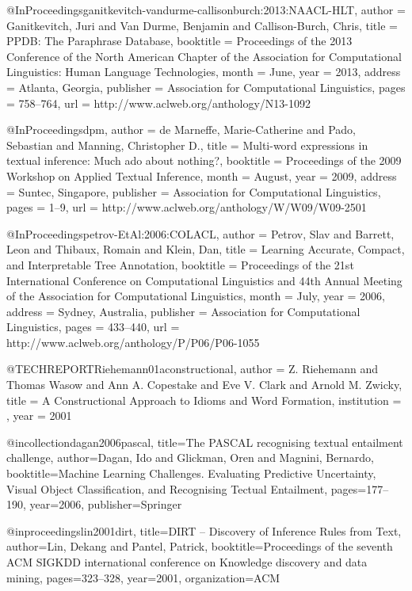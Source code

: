 @InProceedings{ganitkevitch-vandurme-callisonburch:2013:NAACL-HLT,
  author    = {Ganitkevitch, Juri  and  Van Durme, Benjamin  and  Callison-Burch, Chris},
  title     = {PPDB: The Paraphrase Database},
  booktitle = {Proceedings of the 2013 Conference of the North American Chapter of the Association for Computational Linguistics: Human Language Technologies},
  month     = {June},
  year      = {2013},
  address   = {Atlanta, Georgia},
  publisher = {Association for Computational Linguistics},
  pages     = {758--764},
  url       = {http://www.aclweb.org/anthology/N13-1092}
}

@InProceedings{dpm,
  author    = {de Marneffe, Marie-Catherine  and  Pado, Sebastian  and  Manning, Christopher D.},
  title     = {Multi-word expressions in textual inference: Much ado about nothing?},
  booktitle = {Proceedings of the 2009 Workshop on Applied Textual Inference},
  month     = {August},
  year      = {2009},
  address   = {Suntec, Singapore},
  publisher = {Association for Computational Linguistics},
  pages     = {1--9},
  url       = {http://www.aclweb.org/anthology/W/W09/W09-2501}
}

@InProceedings{petrov-EtAl:2006:COLACL,
   author    = {Petrov, Slav  and  Barrett, Leon  and  Thibaux, Romain  and  Klein, Dan},
   title     = {Learning Accurate, Compact, and Interpretable Tree Annotation},
   booktitle = {Proceedings of the 21st International Conference on Computational Linguistics and 44th Annual Meeting of the Association for Computational Linguistics},
   month     = {July},
   year      = {2006},
   address   = {Sydney, Australia},
   publisher = {Association for Computational Linguistics},
   pages     = {433--440},
   url       = {http://www.aclweb.org/anthology/P/P06/P06-1055}
}

@TECHREPORT{Riehemann01aconstructional,
    author = {Z. Riehemann and Thomas Wasow and Ann A. Copestake and Eve V. Clark and Arnold M. Zwicky},
    title = {A Constructional Approach to Idioms and Word Formation},
    institution = {},
    year = {2001}
}


@incollection{dagan2006pascal,
  title={The PASCAL recognising textual entailment challenge},
  author={Dagan, Ido and Glickman, Oren and Magnini, Bernardo},
  booktitle={Machine Learning Challenges. Evaluating Predictive Uncertainty, Visual Object Classification, and Recognising Tectual Entailment},
  pages={177--190},
  year={2006},
  publisher={Springer}
}


@inproceedings{lin2001dirt,
  title={{DIRT} -- {Discovery of Inference Rules from Text}},
  author={Lin, Dekang and Pantel, Patrick},
  booktitle={Proceedings of the seventh ACM SIGKDD international conference on Knowledge discovery and data mining},
  pages={323--328},
  year={2001},
  organization={ACM}
}


